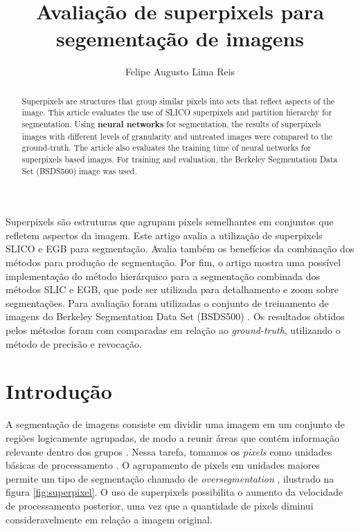 \title{Avaliação de superpixels para segementação de imagens}
\author{Felipe Augusto Lima Reis\inst{1}}
\begin{document}
 

\maketitle

\begin{abstract}
  Superpixels are structures that group similar pixels into sets that reflect aspects of the image. This article evaluates the use of SLICO superpixels and partition hierarchy for segmentation. Using \textbf{neural networks} for segmentation, the results of superpixels images with different levels of granularity and untreated images were compared to the ground-truth. The article also evaluates the training time of neural networks for superpixels based images. For training and evaluation, the Berkeley Segmentation Data Set (BSDS500) \cite{BSDS500} image was used.
\end{abstract}
     
\begin{resumo} 
  Superpixels são estruturas que agrupam pixels semelhantes em conjuntos que refletem aspectos da imagem. Este artigo avalia a utilização de superpixels SLICO e EGB para segmentação. Avalia também os benefícios da combinação dos métodos para produção de segmentação. Por fim, o artigo mostra uma possível implementação do método hierárquico para a segmentação combinada dos métodos SLIC e EGB, que pode ser utilizada para detalhamento e zoom sobre segmentações. Para avaliação foram utilizadas o conjunto de treinamento de imagens do Berkeley Segmentation Data Set (BSDS500) \cite{BSDS500}. Os resultados obtidos pelos métodos foram com comparadas em relação ao \textit{ground-truth}, utilizando o método de precisão e revocação.
\end{resumo}


\section{Introdução} \label{sec:introducao}

A segmentação de imagens consiste em dividir uma imagem em um conjunto de regiões logicamente agrupadas, de modo a reunir áreas que contém informação relevante dentro dos grupos \cite{DOMINGUEZ}. Nessa tarefa, tomamos os \textit{pixels} como unidades básicas de processamento \cite{WANG201728}. O agrupamento de pixels em unidades maiores permite um tipo de segmentação chamado de \textit{oversegmentation} \cite{WANG201728}, ilustrado na figura \ref{fig:superpixel}. O uso de superpixels possibilita o aumento da velocidade de processamento posterior, uma vez que a quantidade de pixels diminui consideravelmente em relação a imagem original.
\end{document}
